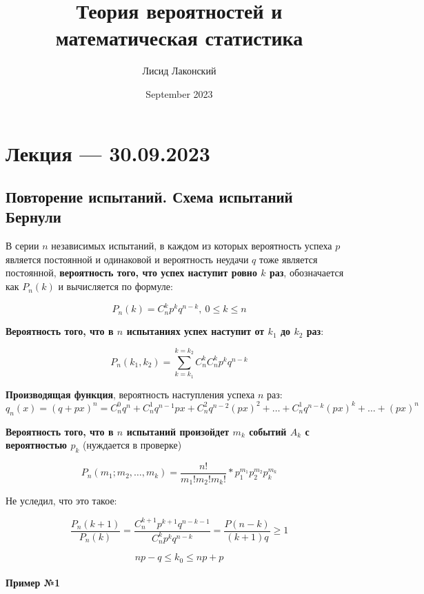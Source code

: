 \documentclass{article}
\title{Теория вероятностей и математическая статистика}
\author{Лисид Лаконский}
\date{September 2023}
\begin{document}
\raggedright

\maketitle

\tableofcontents
\pagebreak

\section{Лекция — 30.09.2023}

\subsection{Повторение испытаний. Схема испытаний Бернули}

В серии $n$ независимых испытаний, в каждом из которых вероятность успеха $p$ является постоянной и одинаковой и вероятность неудачи $q$ тоже является постоянной, \textbf{вероятность того, что успех наступит ровно $k$ раз}, обозначается как $P_{n}(k)$ и вычисляется по формуле:

$$P_{n}(k) = C_{n}^{k} p^{k} q^{n - k}, \ 0 \le k \le n$$

\textbf{Вероятность того, что в $n$ испытаниях успех наступит от $k_{1}$ до $k_{2}$ раз}:

$$P_{n}(k_1, k_2) = \sum\limits_{k = k_1}^{k = k_2} C_{n}^{k} C_{n}^{k} p^{k} q^{n - k}$$

\textbf{Производящая функция}, вероятность наступления успеха $n$ раз: $q_{n}(x) = (q + px)^{n} = C_{n}^{0} q^{n} + C_{n}^{1} q^{n - 1} p x + C_{n}^{2} q^{n - 2} (p x)^{2} + \dots + C_{n}^{1} q^{n - k} (p x)^{k} + \dots + (p x)^{n}$

\textbf{Вероятность того, что в $n$ испытаний произойдет $m_{k}$ событий $A_{k}$ с вероятностью $p_{k}$} (нуждается в проверке)

$$P_{n}(m_1; m_2, \dots, m_k) = \frac{n!}{m_{1}! m_{2}! m_{k}!} * p_{1}^{m_1} p_{2}^{m_2} p_{k}^{m_k}$$

Не уследил, что это такое:

$$\frac{P_{n}(k + 1)}{P_{n}(k)} = \frac{C_{n}^{k + 1} p^{k + 1} q^{n - k - 1}}{C_{n}^{k} p^{k} q^{n - k}} = \frac{P(n - k)}{(k + 1) q} \ge 1$$

$$np - q \le k_0 \le np + p$$

\paragraph{Пример №1}
\end{document}
